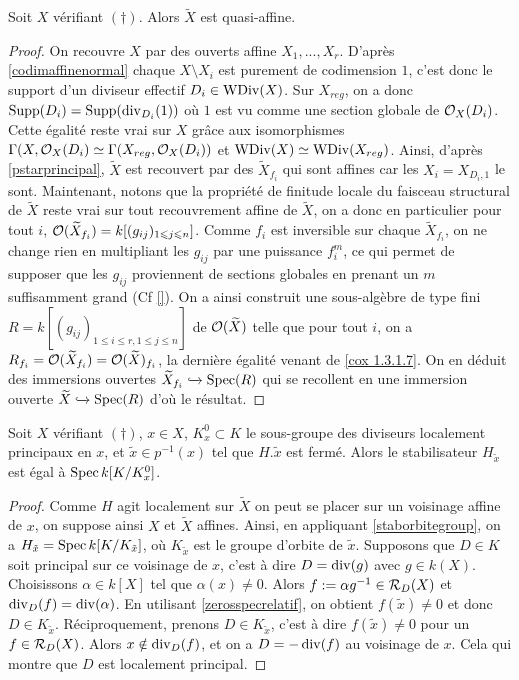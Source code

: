 \begin{cor}
Soit $X$ vérifiant $(\dagger)$. Alors $\widetilde{X}$ est quasi-affine.
\end{cor}
\begin{proof}
On recouvre $X$ par des ouverts affine $X_1,...,X_r$. D'après \ref{codimaffinenormal} chaque $X\setminus X_i$ est purement de codimension $1$, c'est donc le support d'un diviseur effectif $D_i\in \operatorname{WDiv}(X)$. Sur $X_{reg}$, on a donc $\operatorname{Supp}(D_i)=\operatorname{Supp}(\operatorname{div}_{D_i}(1))$ où $1$ est vu comme une section globale de $\mathcal{O}_X(D_i)$. Cette égalité reste vrai sur $X$ grâce aux isomorphismes $\Gamma(X ,\mathcal{O}_X(D_i)\simeq\Gamma(X_{reg} ,\mathcal{O}_X(D_i))$ et $\operatorname{WDiv}(X)\simeq\operatorname{WDiv}(X_{reg})$. Ainsi, d'après \ref{pstarprincipal}, $\widetilde{X}$ est recouvert par des $\widetilde{X}_{f_i}$ qui sont affines car les $X_i=X_{D_i,1}$ le sont. Maintenant, notons que la propriété de finitude locale du faisceau structural de $\widetilde{X}$ reste vrai sur tout recouvrement affine de $\widetilde{X}$, on a donc en particulier pour tout $i$, $\mathcal{O}(\widetilde{X}_{f_i})=k[(g_{ij})_{1\leqslant j\leqslant n}]$. Comme $f_i$ est inversible sur chaque $\widetilde{X}_{f_i}$, on ne change rien en multipliant les $g_{ij}$ par une puissance $f_i^m$, ce qui permet de supposer que les $g_{ij}$ proviennent de sections globales en prenant un $m$ suffisamment grand (Cf \ref{}). On a ainsi construit une sous-algèbre de type fini $R=k[(g_{ij})_{1\leq i\leq r, 1\leq j\leq n}]$ de $\mathcal{O}(\widetilde{X})$ telle que pour tout $i$, on a $R_{f_i}=\mathcal{O}({\widetilde{X}_{f_i}})=\mathcal{O}({\widetilde{X}})_{f_i}$, la dernière égalité venant de \ref{cox 1.3.1.7}. On en déduit des immersions ouvertes $\widetilde{X}_{f_i}\xhookrightarrow{} \operatorname{Spec}(R)$ qui se recollent en une immersion ouverte $\widetilde{X}\xhookrightarrow{} \operatorname{Spec}(R)$ d'où le résultat.
\end{proof}

\begin{cor}
Soit $X$ vérifiant $(\dagger)$, $x\in X$, $K_x^0\subset K$ le sous-groupe des diviseurs localement principaux en $x$, et $\tilde{x}\in p^{-1}(x)$ tel que $H.\tilde{x}$ est fermé. Alors le stabilisateur $H_{\tilde{x}}$ est égal à $\operatorname{Spec} k[K/K_x^0]$.
\end{cor}
\begin{proof}
Comme $H$ agit localement sur $\widetilde{X}$ on peut se placer sur un voisinage affine de $x$, on suppose ainsi $X$ et $\widetilde{X}$ affines. Ainsi, en appliquant \ref{staborbitegroup}, on a $H_{\tilde{x}}=\operatorname{Spec} k[K/K_{\tilde{x}}]$, où $K_{\tilde{x}}$ est le groupe d'orbite de $\tilde{x}$. Supposons que $D\in K$ soit principal sur ce voisinage de $x$, c'est à dire $D=\operatorname{div}(g)$ avec $g\in k(X)$. Choisissons $\alpha \in k[X]$ tel que $\alpha(x)\neq 0$. Alors $f:=\alpha g^{-1}\in \mathcal{R}_D(X)$ et $\operatorname{div}_D(f)=\operatorname{div}(\alpha)$. En utilisant \ref{zerosspecrelatif}, on obtient $f(\tilde{x})\neq 0$ et donc $D\in K_{\tilde{x}}$. Réciproquement, prenons $D\in K_{\tilde{x}}$, c'est à dire $f(\tilde{x})\neq 0$ pour un $f\in \mathcal{R}_D(X)$. Alors $x\notin \operatorname{div}_D(f)$, et on a $D=-\operatorname{div}(f)$ au voisinage de $x$. Cela qui montre que $D$ est localement principal.
\end{proof}

